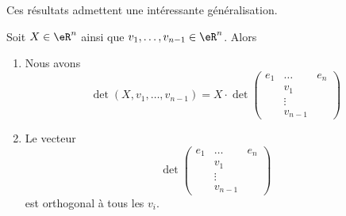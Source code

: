Ces résultats admettent une intéressante généralisation.
\begin{lemma}       \label{LEMooFRWKooVloCSM}
    Soit \( X\in \eR^n\) ainsi que \( v_1,\ldots, v_{n-1}\in \eR^n\). Alors
    \begin{enumerate}
        \item
            Nous avons
            \begin{equation}        \label{EQooMQNPooRHHBjz}
                \det(X,v_1,\ldots, v_{n-1})=X\cdot
                \det\begin{pmatrix}
                     e_1   &   \ldots    &   e_n    \\
                        &   v_1    &       \\
                        &   \vdots    &       \\
                        &   v_{n-1}    &
                 \end{pmatrix}
            \end{equation}
        \item
            Le vecteur
            \begin{equation}
                \det\begin{pmatrix}
                     e_1   &   \ldots    &   e_n    \\
                        &   v_1    &       \\
                        &   \vdots    &       \\
                        &   v_{n-1}    &
                 \end{pmatrix}
            \end{equation}
            est orthogonal à tous les \( v_i\).
    \end{enumerate}
\end{lemma}

